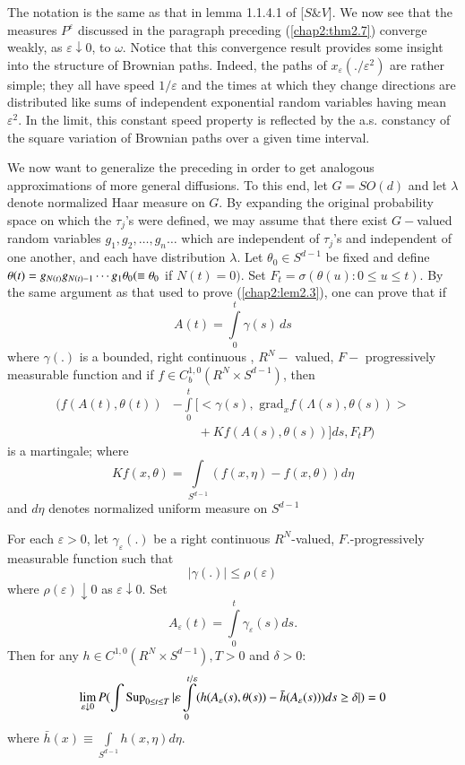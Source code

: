 The notation is the same as that in lemma 1.1.4.1 of [$S \& V$]. We
now see that the measures $P^\varepsilon$ discussed in the paragraph
preceding (\ref{chap2:thm2.7}) converge weakly, as $\varepsilon
\downarrow 0$, to 
$\omega$. Notice that this convergence result provides some insight
into the structure of Brownian paths. Indeed, the paths of
$x_\varepsilon (./\varepsilon^2)$ are rather simple; they all have
speed  $1/\varepsilon$ and the times at which they change directions
are distributed like sums of independent exponential random variables
having mean $\varepsilon^2$. In the limit, this constant speed
property is reflected by the a.s. constancy of the square variation of
Brownian paths over a given time interval. 

We now want to generalize the preceding in order to get analogous
approximations of more general diffusions. To this end, let $G =
SO(d)$ and let $\lambda$ denote normalized Haar measure on $G$. By
expanding the original probability space on which the $\tau_j$'s were
defined, we may assume that there exist $G-$valued random variables
$g_1 , g_2,\ldots , g_n \ldots$ which are independent of $\tau_j$'s
and independent of one another, and each have distribution
$\lambda$. Let $\theta_0 \in S^{d-1}$ be fixed and define
$\theta(t) = g_{N(t)} g_{N(t)-1} \cdots g_1 \theta_0\break ( \equiv
\theta_0$ if $N(t) = 0)$. Set $F_t = \sigma(\theta(u) : 0 \le u \le
t)$. By the same argument as that used to prove (\ref{chap2:lem2.3}),
one can prove that if  
$$
A(t) = \int\limits^t_0 \gamma (s)\, ds  
$$\pageoriginale
where $\gamma(.)$ is a bounded, right continuous , $R^N-$ valued, $F-$
progressively measurable function and if $f \in C^{1,0}_b (R^N
\times S^{d-1})$, then  
\begin{align*}
(f(A(t), \theta (t)) & - \int\limits^t_0 [< \gamma (s), \text{ grad}_x
    f(\Lambda(s), \theta(s)) > \\
& \qquad + Kf (A(s), \theta(s))]ds, F_t P)  \tag{2.8}\label{chap2:eq2.8}  
\end{align*}
is a martingale; where
$$
Kf(x,\theta) = \int\limits_{S^{d-1}} (f(x,\eta) -f (x, \theta))d \eta
$$
and $d \eta$ denotes normalized uniform measure on $S^{d-1}$

\setcounter{lemma}{8}
\begin{lemma}%
For each $\varepsilon > 0$, let $\gamma_\varepsilon(.)$ be a right
continuous $R^N$-valued, $F$.-progressively measurable function such
that 
$$
|\gamma (.)| \le \rho (\varepsilon) 
$$
where $\rho(\varepsilon) \downarrow 0$ as $\varepsilon \downarrow
0$. Set 
$$
A_\varepsilon (t) = \int \limits^t_0 \gamma_\varepsilon (s)ds.
$$
Then for any $h \in C^{1,0}(R^N \times S^{d-1}), T > 0$ and
$\delta > 0$: 
$$
\lim \limits_{\varepsilon \downarrow 0} P(\int \operatorname{Sup}\limits_{0 \le t
  \le T} | \varepsilon \int\limits^{t/\varepsilon}_0 (h(A_\varepsilon(s),
\theta(s)) -\bar{h}(A_\varepsilon (s))) ds \ge \delta | ) = 0 
$$
where $\bar{h}(x) \equiv  \int \limits_{S^{d-1}} h(x, \eta)d\eta$. 
\end{lemma}

